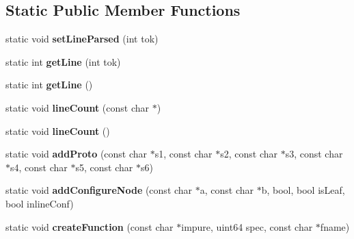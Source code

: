 \subsection*{Static Public Member Functions}
\begin{DoxyCompactItemize}
\item 
\mbox{\label{classvhdl_1_1parser_1_1_vhdl_parser_a73e994c04b955d5c5122d48a4e7fdd51}} 
static void {\bfseries set\+Line\+Parsed} (int tok)
\item 
\mbox{\label{classvhdl_1_1parser_1_1_vhdl_parser_ac59b8eac337e599dc32452cb11bff7ca}} 
static int {\bfseries get\+Line} (int tok)
\item 
\mbox{\label{classvhdl_1_1parser_1_1_vhdl_parser_a2fe9d70295a62b37b4aff5408776fdd1}} 
static int {\bfseries get\+Line} ()
\item 
\mbox{\label{classvhdl_1_1parser_1_1_vhdl_parser_aec128c05f48607993ff8a3bb2e508c54}} 
static void {\bfseries line\+Count} (const char $\ast$)
\item 
\mbox{\label{classvhdl_1_1parser_1_1_vhdl_parser_a451b9d6f21914e123c5e8ac13a849bdd}} 
static void {\bfseries line\+Count} ()
\item 
\mbox{\label{classvhdl_1_1parser_1_1_vhdl_parser_a98d18490d8b901905709d8ccb95af60f}} 
static void {\bfseries add\+Proto} (const char $\ast$s1, const char $\ast$s2, const char $\ast$s3, const char $\ast$s4, const char $\ast$s5, const char $\ast$s6)
\item 
\mbox{\label{classvhdl_1_1parser_1_1_vhdl_parser_a79b459f023dca7b723ca0117ed263c12}} 
static void {\bfseries add\+Configure\+Node} (const char $\ast$a, const char $\ast$b, bool, bool is\+Leaf, bool inline\+Conf)
\item 
\mbox{\label{classvhdl_1_1parser_1_1_vhdl_parser_a65e0853e6ea999f574192a7116b3c923}} 
static void {\bfseries create\+Function} (const char $\ast$impure, uint64 spec, const char $\ast$fname)

\end{DoxyCompactItemize}
